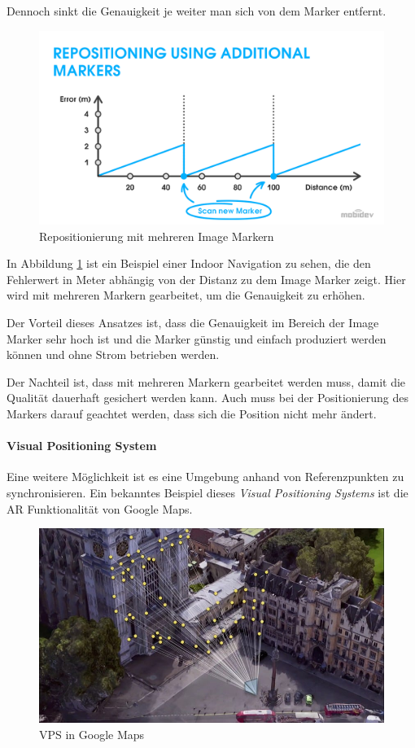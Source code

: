 \documentclass[titlepage, a4paper, 11pt]{scrartcl}
\begin{document}
    Dennoch sinkt die Genauigkeit je weiter man sich von dem Marker entfernt.

    \begin{figure}[h]
      \centering
      \includegraphics[width=.6\textwidth]{multi-marker}
      \caption{Repositionierung mit mehreren Image Markern \cite{HowAugme98:online}}
      \label{MultiMarker}
    \end{figure}

    In Abbildung \ref{MultiMarker} ist ein Beispiel einer Indoor Navigation zu sehen, die den Fehlerwert in Meter abhängig von der Distanz zu dem Image Marker zeigt.
    Hier wird mit mehreren Markern gearbeitet, um die Genauigkeit zu erhöhen.

    Der Vorteil dieses Ansatzes ist, dass die Genauigkeit im Bereich der Image Marker sehr hoch ist und die Marker günstig und einfach produziert werden können und ohne Strom betrieben werden.

    Der Nachteil ist, dass mit mehreren Markern gearbeitet werden muss, damit die Qualität dauerhaft gesichert werden kann. Auch muss bei der Positionierung des Markers darauf geachtet werden, dass sich die Position nicht mehr ändert.

    \paragraph{Visual Positioning System}

    Eine weitere Möglichkeit ist es eine Umgebung anhand von Referenzpunkten zu synchronisieren.
    Ein bekanntes Beispiel dieses \textit{Visual Positioning Systems} ist die AR Funktionalität von Google Maps.
    
    \begin{figure}[h]
      \centering
      \includegraphics[width=.5\textwidth]{vps-google}
      \caption{VPS in Google Maps \cite{GoogleMa12:online}}
      \label{VPSGoogle}
    \end{figure}
\end{document}
